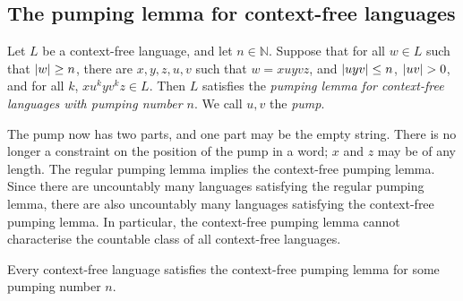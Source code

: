 \subsection{The pumping lemma for context-free languages}
\begin{definition}
	Let \( L \) be a context-free language, and let \( n \in \mathbb N \).
	Suppose that for all \( w \in L \) such that \( \abs{w} \geq n \), there are \( x, y, z, u, v \) such that \( w = xuyvz \), and \( \abs{uyv} \leq n \), \( \abs{uv} > 0 \), and for all \( k \), \( xu^kyv^kz \in L \).
	Then \( L \) satisfies the \emph{pumping lemma for context-free languages with pumping number \( n \)}.
	We call \( u,v \) the \emph{pump}.
\end{definition}
\begin{remark}
	The pump now has two parts, and one part may be the empty string.
	There is no longer a constraint on the position of the pump in a word; \( x \) and \( z \) may be of any length.
	The regular pumping lemma implies the context-free pumping lemma.
	Since there are uncountably many languages satisfying the regular pumping lemma, there are also uncountably many languages satisfying the context-free pumping lemma.
	In particular, the context-free pumping lemma cannot characterise the countable class of all context-free languages.
\end{remark}
\begin{theorem}
	Every context-free language satisfies the context-free pumping lemma for some pumping number \( n \).
\end{theorem}

